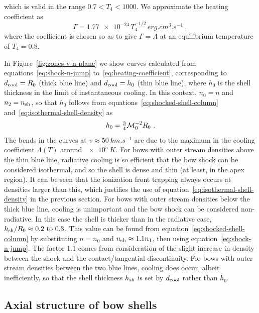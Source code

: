 which is valid in the range \(0.7 < T_4 < 1000\).  We approximate the heating coefficient as
\begin{equation}
  \label{eq:heating-coefficient}
  \Gamma = \num{1.77e-24} \, T_4^{-1/2} \, \si{erg.cm^{3}.s^{-1}} \ ,
\end{equation}
where the coefficient is chosen so as to give \(\Gamma = \Lambda\) at
an equilibrium temperature of \(T_4 = 0.8\).

In Figure~\ref{fig:zones-v-n-plane} we show curves calculated from
equations~\eqref{eq:shock-n-jump} to~\eqref{eq:heating-coefficient},
corresponding to \(d_{\text{cool}} = R_0\) (thick blue line) and
\(d_{\text{cool}} = h_0\) (thin blue line), where \(h_0\) is the shell
thickness in the limit of instantaneous cooling.  In this context,
\(n_0 = n\) and \(n_2 = n_{\text{sh}}\), so that \(h_0\) follows from
equations~\eqref{eq:shocked-shell-column}
and~\eqref{eq:isothermal-shell-density} as
\begin{equation}
  \label{eq:strong-cooling-h0}
  h_0 = \tfrac34 \mathcal{M}_0^{-2} R_0 \ .
\end{equation}
The bends in the curves at \(v \approx \SI{50}{km.s^{-1}}\) are due to the
maximum in the cooling coefficient \(\Lambda(T)\) around
\(\SI{e5}{K}\).  For bows with outer stream densities above the thin
blue line, radiative cooling is so efficient that the bow shock can be
considered isothermal, and so the shell is dense and thin (at least,
in the apex region).  It can be seen that the ionization front
trapping always occurs at densities larger than this, which justifies
the use of equation~\eqref{eq:isothermal-shell-density} in the
previous section.  For bows with outer stream densities below the
thick blue line, cooling is unimportant and the bow shock can be
considered non-radiative.  In this case the shell is thicker than in
the radiative case,
\(h\shell/R_0 \approx \text{\numrange{0.2}{0.3}}\).  This value can be found
from equation~\eqref{eq:shocked-shell-column} by substituting
\(n = n_0\) and \(n_{\text{sh}} \approx 1.1 n_1\), then using
equation~\eqref{eq:shock-n-jump}. The factor \num{1.1} comes from
consideration of the slight increase in density between the shock and
the contact/tangential discontinuity.  For bows with outer stream
densities between the two blue lines, cooling does occur, albeit
inefficiently, so that the shell thickness \(h_{\text{sh}}\) is set by
\(d_{\text{cool}}\) rather than \(h_0\).

\subsection{Axial structure of bow shells}
\label{sec:axial-structure-bow}


